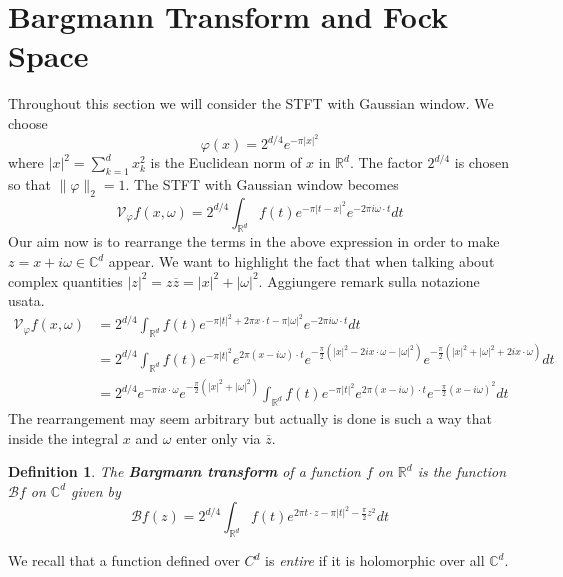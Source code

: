 \documentclass[corpo=11pt, stile=classica, tipotesi=custom,
greek, evenboxes, english]{toptesi}
\numberwithin{equation}{chapter}
\newtheorem{defi}[teo]{Definition}
\theoremstyle{remark}
\newcommand{\R}{\mathbb{R}} %
\newcommand{\V}{\mathcal{V}} %
\newcommand{\C}{\mathbb{C}} %
\newcommand{\Barg}{\mathcal{B}} %
\begin{document}
\section{Bargmann Transform and Fock Space}\label{section Fock Space and Bargmann transform}
{\color{blue} Throughout this section we will consider the STFT with Gaussian window.} We choose
\begin{equation}\label{gaussian normalized}
	\varphi(x) = 2^{d/4} e^{-\pi |x|^2}
\end{equation}
where $|x|^2 = \sum_{k=1}^d x_k^2$ is the Euclidean norm of $x$ in $\R^d$. The factor $2^{d/4}$ is chosen so that $\|\varphi\|_2=1$. The STFT with Gaussian window becomes
\begin{equation}
	\V_{\varphi}f(x,\omega) = 2^{d/4} \int_{\R^d} f(t) e^{-\pi |t-x|^2} e^{-2 \pi i \omega \cdot t} dt
\end{equation}
Our aim now is to rearrange the terms in the above expression in order to make $z=x+i\omega \in \C^d$ appear. We want to highlight the fact that when talking about complex quantities $|z|^2 = z \overline{z} = |x|^2 + |\omega|^2$. {\color{blue}  Aggiungere remark sulla notazione usata}.
\begin{align*}
	\V_{\varphi}f(x,\omega) &= 2^{d/4} \int_{\R^d} f(t) e^{-\pi |t|^2 + 2 \pi x \cdot t - \pi |\omega|^2} e^{ - 2 \pi i \omega \cdot t} dt\\
							&= 2^{d/4} \int_{\R^d} f(t) e^{-\pi |t|^2} e^{2 \pi (x - i \omega) \cdot t} e^{-\frac{\pi}{2}\left(|x|^2 - 2 i x \cdot \omega - |\omega|^2\right)} e^{-\frac{\pi}{2}\left(|x|^2 + |\omega|^2 + 2 i x \cdot \omega\right)}dt\\
							&= 2^{d/4} e^{-\pi i x \cdot \omega} e^{-\frac{\pi}{2}\left(|x|^2 + |\omega|^2\right)} \int_{\R^d} f(t) e^{-\pi |t|^2} e^{2 \pi (x-i\omega) \cdot t}e^{-\frac{\pi}{2}(x-i\omega)^2}dt
\end{align*}
The rearrangement may seem arbitrary but actually is done is such a way that inside the integral $x$ and $\omega$ enter only via $\overline{z}$.
\begin{defi}\label{Bargmann transform}
	The \textbf{Bargmann transform} of a function $f$ on $\R^d$ is the function $\Barg f$ on $\C^d$ given by
	\begin{equation}\label{Bargmann transform formula}
		\Barg f(z) = 2^{d/4} \int_{\R^d} f(t) e^{2 \pi t \cdot z - \pi |t|^2 - \frac{\pi}{2}z^2}dt
	\end{equation}
\end{defi}
We recall that a function defined over $C^d$ is \emph{entire} if it is holomorphic over all $\C^d$.
\end{document}
